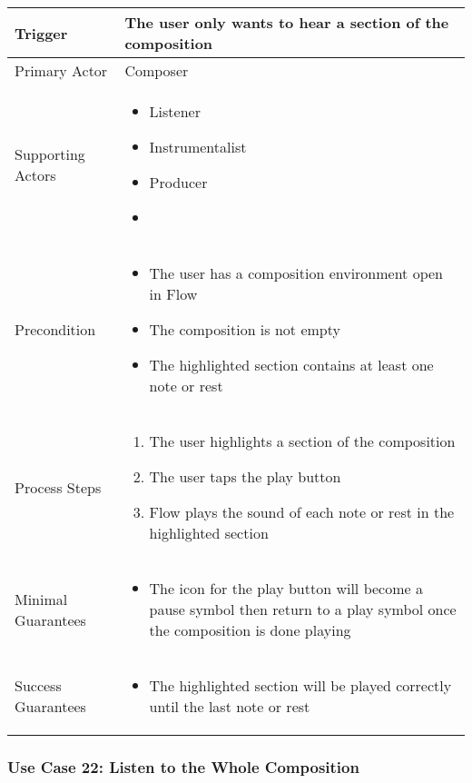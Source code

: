 \begin{tabularx}{\textwidth}{|X|X|}
\hline
Trigger & 
The user only wants to hear a section of the composition \\
\hline
Primary Actor & 
Composer \\
\hline
Supporting Actors & 
\begin{itemize}
\item Listener
\item Instrumentalist
\item Producer
\item
\end{itemize} \\
\hline
Precondition & 
\begin{itemize}
\item The user has a composition environment open in Flow
\item The composition is not empty
\item The highlighted section contains at least one note or rest
\end{itemize} \\
\hline
Process Steps & 
\begin{enumerate}
\item The user highlights a section of the composition
\item The user taps the play button
\item Flow plays the sound of each note or rest in the highlighted section
\end{enumerate} \\
\hline
Minimal Guarantees & 
\begin{itemize}
  \item The icon for the play button will become a pause symbol then return to a play symbol once the composition is done playing
\end{itemize} \\
\hline
Success Guarantees & 
\begin{itemize}
  \item The highlighted section will be played correctly until the last note or rest
\end{itemize} \\
\hline
\end{tabularx}

\subsubsection{Use Case 22: Listen to the Whole Composition}

